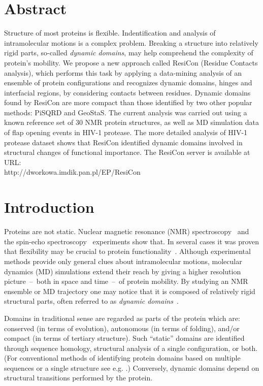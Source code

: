 \documentclass[a4paper,11pt,twoside]{book}%
\begin{document}
\section{Abstract}

Structure of most proteins is flexible.
Indentification and analysis of intramolecular motions is a complex problem.
Breaking a structure into relatively rigid parts, so-called \emph{dynamic domains}, may help comprehend the complexity of protein's mobility. 
We propose a new approach called ResiCon (Residue Contacts analysis), which performs this task by applying a data-mining analysis of an ensemble of protein configurations and recognizes dynamic domains, hinges and interfacial regions, by considering contacts between residues. 
Dynamic domains found by ResiCon are more compact than those identified by two other popular methods: PiSQRD and GeoStaS.
The current analysis was carried out using a known reference set of 30 NMR protein structures, as well as MD simulation data of flap opening events in HIV-1 protease.
The more detailed analysis of HIV-1 protease dataset shows that ResiCon identified dynamic domains involved in structural changes of functional importance.
The ResiCon server is available at URL:\\ http://dworkowa.imdik.pan.pl/EP/ResiCon

\section{Introduction}
Proteins are not static.
Nuclear magnetic resonance (NMR) spectroscopy~\cite{martin1988two} and the spin-echo spectroscopy~\cite{bu2011proteins} experiments show that.
In several cases it was proven that flexibility may be crucial to protein functionality~\cite{farago2010activation,hamelberg2005fast}.
Although experimental methods provide only general clues about intramolecular motions, molecular dynamics (MD) simulations extend their reach by giving a higher resolution picture~--~both in space and time~--~of protein mobility.
By studying an NMR ensemble or MD trajectory one may notice that it is composed of relatively rigid structural parts, often referred to as \emph{dynamic domains}~\cite{hayward1997model}.

Domains in traditional sense are regarded as parts of the protein which are: conserved (in terms of evolution), autonomous (in terms of folding), and/or compact (in terms of tertiary structure).
Such ``static'' domains are identified through sequence homology, structural analysis of a single configuration, or both.
(For conventional methods of identifying protein domains based on multiple sequences or a single structure see e.g. \cite{richardson1981anatomy,bork1991shuffled}.)
Conversely, dynamic domains depend on structural transitions performed by the protein.
\end{document}
